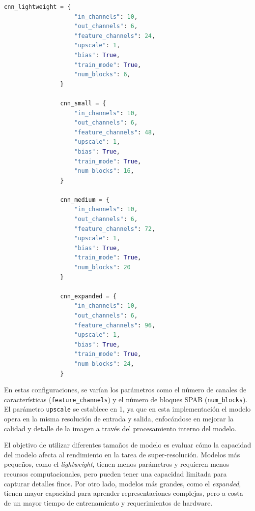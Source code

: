            \begin{lstlisting}[language=Python]
                cnn_lightweight = {
                    "in_channels": 10,
                    "out_channels": 6,
                    "feature_channels": 24,
                    "upscale": 1,
                    "bias": True,
                    "train_mode": True,
                    "num_blocks": 6,
                }
                
                cnn_small = {
                    "in_channels": 10,
                    "out_channels": 6,
                    "feature_channels": 48,
                    "upscale": 1,
                    "bias": True,
                    "train_mode": True,
                    "num_blocks": 16,
                }
                
                cnn_medium = {
                    "in_channels": 10,
                    "out_channels": 6,
                    "feature_channels": 72,
                    "upscale": 1,
                    "bias": True,
                    "train_mode": True,
                    "num_blocks": 20
                }
                
                cnn_expanded = {
                    "in_channels": 10,
                    "out_channels": 6,
                    "feature_channels": 96,
                    "upscale": 1,
                    "bias": True,
                    "train_mode": True,
                    "num_blocks": 24,
                }
            \end{lstlisting}


            En estas configuraciones, se varían los parámetros como el número de canales de características (\texttt{feature\_channels}) y el número de bloques SPAB (\texttt{num\_blocks}). El parámetro \texttt{upscale} se establece en 1, ya que en esta implementación el modelo opera en la misma resolución de entrada y salida, enfocándose en mejorar la calidad y detalle de la imagen a través del procesamiento interno del modelo.

            El objetivo de utilizar diferentes tamaños de modelo es evaluar cómo la capacidad del modelo afecta al rendimiento en la tarea de super-resolución. Modelos más pequeños, como el \textit{lightweight}, tienen menos parámetros y requieren menos recursos computacionales, pero pueden tener una capacidad limitada para capturar detalles finos. Por otro lado, modelos más grandes, como el \textit{expanded}, tienen mayor capacidad para aprender representaciones complejas, pero a costa de un mayor tiempo de entrenamiento y requerimientos de hardware.

